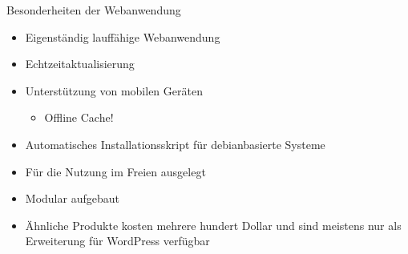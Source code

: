 \begin{frame}{Besonderheiten der Webanwendung}
	\begin{itemize}
		\item Eigenständig lauffähige Webanwendung
		\item Echtzeitaktualisierung
		\item Unterstützung von mobilen Geräten
		\begin{itemize}
			\item Offline Cache!
		\end{itemize}
		\item Automatisches Installationsskript für debianbasierte Systeme
		\item Für die Nutzung im Freien ausgelegt
		\item Modular aufgebaut
		\item Ähnliche Produkte kosten mehrere hundert Dollar und sind meistens nur als Erweiterung für WordPress verfügbar
	\end{itemize}
\end{frame}